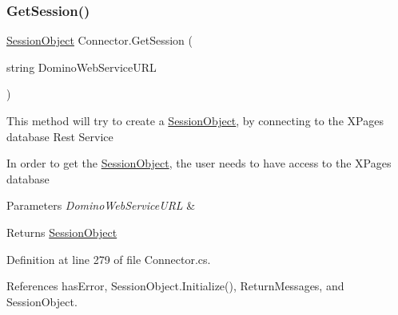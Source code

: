 \subsubsection{\texorpdfstring{Get\+Session()}{GetSession()}}
{\footnotesize\ttfamily \hyperlink{class_session_object}{Session\+Object} Connector.\+Get\+Session (\begin{DoxyParamCaption}\item[{string}]{Domino\+Web\+Service\+U\+RL }\end{DoxyParamCaption})}



This method will try to create a \hyperlink{class_session_object}{Session\+Object}, by connecting to the X\+Pages database Rest Service 

In order to get the \hyperlink{class_session_object}{Session\+Object}, the user needs to have access to the X\+Pages database


\begin{DoxyParams}{Parameters}
{\em Domino\+Web\+Service\+U\+RL} & \\
\hline
\end{DoxyParams}
\begin{DoxyReturn}{Returns}
\hyperlink{class_session_object}{Session\+Object}
\end{DoxyReturn}


Definition at line 279 of file Connector.\+cs.



References has\+Error, Session\+Object.\+Initialize(), Return\+Messages, and Session\+Object.


